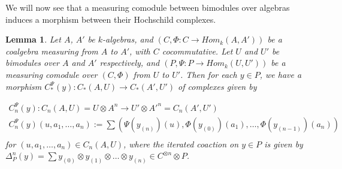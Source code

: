 \documentclass[10pt, colorlinks]{article}
\numberwithin{equation}{section} \DeclareMathSizes{2}{10}{12}{13}
\newtheorem{lem}[thm]{Lemma}
\begin{document}
\smallskip 

We will now see that a measuring comodule between bimodules over algebras induces a morphism between their Hochschild complexes.


\begin{lem}\label{lem5.4pp}
   Let $A$, $A'$ be $k$-algebras, and $(C,\Phi:C\longrightarrow Hom_k(A,A'))$ be a coalgebra measuring from $A$ to $A'$, with $C$ cocommutative. Let $ U$ and $U'$ be bimodules over $A$ and $A'$ respectively, and $(P,\Psi:P\longrightarrow  {Hom}_k(U,U'))$ be a measuring comodule over $(C,\Phi)$ from $U$ to $U'$. Then for each $y\in P$, we have a morphism $C_*^\Psi(y):C_*(A,U)\longrightarrow C_*(A',U')$ of complexes given by
   
\begin{equation}\label{eq5.14p}
\begin{array}{c}
        C_n^\Psi(y):C_n(A,U)=U\otimes A^n\longrightarrow U'\otimes A'^n=C_n(A',U')\\
        C_n^\Psi(y)(u,a_1,\ldots,a_n):=\sum\left(\Psi(y_{(n)})(u),\Phi(y_{(0)})(a_1),\ldots,\Phi(y_{(n-1)})(a_n)\right)\\
      \end{array}
\end{equation}
for $(u,a_1,\ldots,a_n)\in C_n(A,U)$, where the iterated coaction on $y\in P$ is given by $\Delta^{n}_P(y)=  \sum y_{(0)}\otimes y_{(1)}\otimes\ldots\otimes y_{(n)}\in  C^{\otimes n}\otimes P$.
\end{lem}
\end{document}
